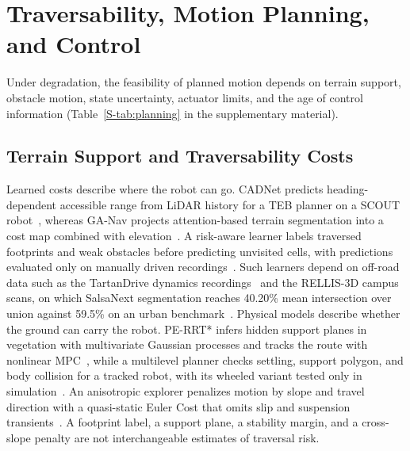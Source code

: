 \section{Traversability, Motion Planning, and Control}
\label{sec:planning}

Under degradation, the feasibility of planned motion depends on terrain support, obstacle motion, state uncertainty, actuator limits, and the age of control information (Table~\ref{S-tab:planning} in the supplementary material).

\subsection{Terrain Support and Traversability Costs}

Learned costs describe where the robot can go. CADNet predicts heading-dependent accessible range from LiDAR history for a TEB planner on a SCOUT robot~\cite{P_M29}, whereas GA-Nav projects attention-based terrain segmentation into a cost map combined with elevation~\cite{P_M40}. A risk-aware learner labels traversed footprints and weak obstacles before predicting unvisited cells, with predictions evaluated only on manually driven recordings~\cite{P_M23}. Such learners depend on off-road data such as the TartanDrive dynamics recordings~\cite{P_K04} and the RELLIS-3D campus scans, on which SalsaNext segmentation reaches 40.20\% mean intersection over union against 59.5\% on an urban benchmark~\cite{P_K02}. Physical models describe whether the ground can carry the robot. PE-RRT* infers hidden support planes in vegetation with multivariate Gaussian processes and tracks the route with nonlinear MPC~\cite{P_M26}, while a multilevel planner checks settling, support polygon, and body collision for a tracked robot, with its wheeled variant tested only in simulation~\cite{P_M12}. An anisotropic explorer penalizes motion by slope and travel direction with a quasi-static Euler Cost that omits slip and suspension transients~\cite{P_N08}. A footprint label, a support plane, a stability margin, and a cross-slope penalty are not interchangeable estimates of traversal risk.

